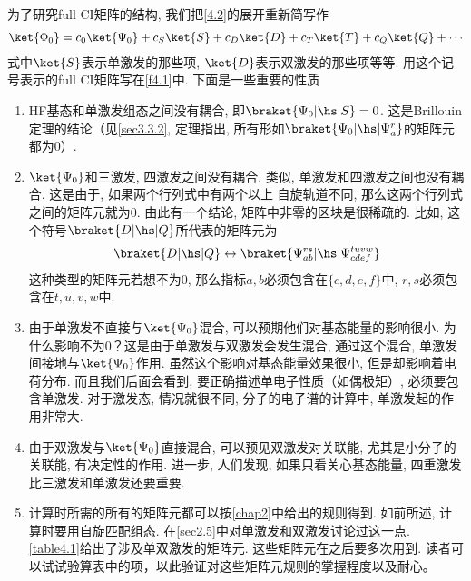为了研究full CI矩阵的结构, 
我们把\autoref{4.2}的展开重新简写作
\begin{align}
\ket{\Phi_0} = c_0\ket{\Psi_0} + c_S\ket{S}+c_D\ket{D} + c_T\ket{T} + c_Q\ket{Q} + \cdots
\end{align}
式中$\ket{S}$表示单激发的那些项, 
$\ket{D}$表示双激发的那些项等等. 
用这个记号表示的full CI矩阵写在\autoref{f4.1}中. 
下面是一些重要的性质
\begin{enumerate}[1.]
	\item HF基态和单激发组态之间没有耦合, 即$\braket{\Psi_0|\hs|S}=0$. 这是Brillouin定理的结论（见\autoref{sec3.3.2}, 定理指出, 所有形如$\braket{\Psi_0|\hs|\Psi_a^r}$的矩阵元都为0）.
	\item
	$\ket{\Psi_0}$和三激发, 四激发之间没有耦合. 类似, 单激发和四激发之间也没有耦合. 这是由于, 如果两个行列式中有两个以上 自旋轨道不同, 那么这两个行列式之间的\ha 矩阵元就为0. 由此有一个结论, 矩阵中非零的区块是很稀疏的. 比如, 这个符号$\braket{D|\hs|Q}$所代表的矩阵元为
	\begin{align*}
	\braket{D|\hs|Q} \leftrightarrow \braket{\Psi_{ab}^{rs}|\hs|\Psi_{cdef}^{tuvw}}
	\end{align*}
	这种类型的矩阵元若想不为0, 那么指标$a,b$必须包含在$\{c,d,e,f\}$中, $r,s$必须包含在$t,u,v,w$中.
	
	\item
	由于单激发不直接与$\ket{\Psi_0}$混合, 可以预期他们对基态能量的影响很小. 为什么影响不为0？这是由于单激发与双激发会发生混合, 通过这个混合, 单激发间接地与$\ket{\Psi_0}$作用. 虽然这个影响对基态能量效果很小, 但是却影响着电荷分布. 而且我们后面会看到, 要正确描述单电子性质（如偶极矩）, 必须要包含单激发. 对于激发态, 情况就很不同, 分子的电子谱的计算中, 单激发起的作用非常大.
	\item 
	由于双激发与$\ket{\Psi_0}$直接混合, 可以预见双激发对关联能, 尤其是小分子的关联能, 有决定性的作用. 进一步, 人们发现, 如果只看关心基态能量, 四重激发比三激发和单激发还要重要.
	\item
	计算时所需的所有的矩阵元都可以按\autoref{chap2}中给出的规则得到. 
如前所述, 计算时要用自旋匹配组态. 
在\autoref{sec2.5}中对单激发和双激发讨论过这一点. 
\autoref{table4.1}给出了涉及单双激发的矩阵元. 这些矩阵元在之后要多次用到. 读者可以试试验算表中的项，以此验证对这些矩阵元规则的掌握程度以及耐心。
\end{enumerate}
